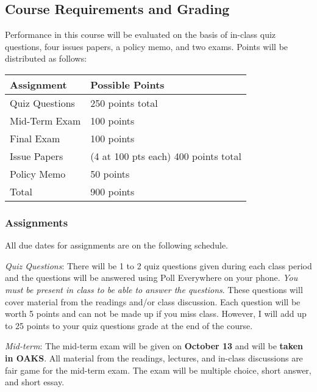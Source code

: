 \hypertarget{course-requirements-and-grading}{%
\subsection{Course Requirements and
Grading}\label{course-requirements-and-grading}}

Performance in this course will be evaluated on the basis of in-class
quiz questions, four issues papers, a policy memo, and two exams. Points
will be distributed as follows:

\vspace{0.1in}
\begin{tabular}{ l l}
\hline
Assignment & Possible Points \\ 
\hline
Quiz Questions & 250 points total \\
Mid-Term Exam & 100 points \\ 
Final Exam & 100 points \\
Issue Papers & (4 at 100 pts each) 400 points total \\
Policy Memo & 50 points \\
\hline
Total &  900 points \\
\hline
\end{tabular}

\hypertarget{assignments}{%
\subsubsection{Assignments}\label{assignments}}

All due dates for assignments are on the following schedule.

\vspace{0.1in}

\noindent \emph{Quiz Questions}: There will be 1 to 2 quiz questions
given during each class period and the questions will be answered using
Poll Everywhere on your phone. \emph{You must be present in class to be
able to answer the questions}. These questions will cover material from
the readings and/or class discussion. Each question will be worth 5
points and can not be made up if you miss class. However, I will add up
to 25 points to your quiz questions grade at the end of the course.

\vspace{0.1in}

\noindent \emph{Mid-term}: The mid-term exam will be given on
\textbf{October 13} and will be \textbf{taken in OAKS}. All material
from the readings, lectures, and in-class discussions are fair game for
the mid-term exam. The exam will be multiple choice, short answer, and
short essay.

